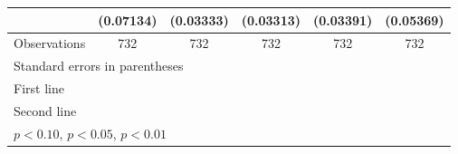 \begin{table}[htbp]
\begin{tabular}{l*{5}{c}}
                    &   (0.07134)         &   (0.03333)         &   (0.03313)         &   (0.03391)         &   (0.05369)         \\
\midrule
Observations        &         732         &         732         &         732         &         732         &         732         \\
\bottomrule
\multicolumn{6}{l}{\footnotesize Standard errors in parentheses}\\
\multicolumn{6}{l}{\footnotesize First line}\\
\multicolumn{6}{l}{\footnotesize Second line}\\
\multicolumn{6}{l}{\footnotesize \sym{*} \(p<0.10\), \sym{**} \(p<0.05\), \sym{***} \(p<0.01\)}\\
\end{tabular}
\end{table}
